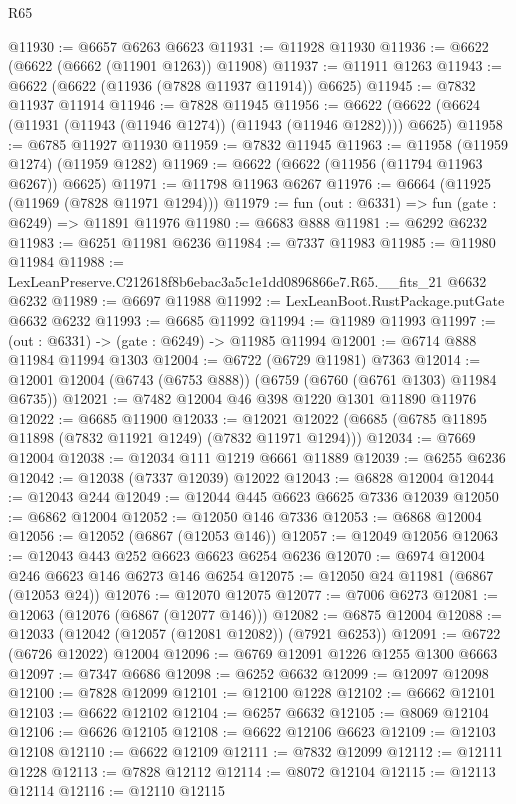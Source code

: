 \begin{lexlean}{R65}
\begin{coremodule}
{@11930 := @6657 @6263 @6623
@11931 := @11928 @11930
@11936 := @6622 (@6622 (@6662 (@11901 @1263)) @11908)
@11937 := @11911 @1263
@11943 := @6622 (@6622 (@11936 (@7828 @11937 @11914)) @6625)
@11945 := @7832 @11937 @11914
@11946 := @7828 @11945
@11956 := @6622 (@6622 (@6624 (@11931 (@11943 (@11946 @1274)) (@11943 (@11946 @1282)))) @6625)
@11958 := @6785 @11927 @11930
@11959 := @7832 @11945
@11963 := @11958 (@11959 @1274) (@11959 @1282)
@11969 := @6622 (@6622 (@11956 (@11794 @11963 @6267)) @6625)
@11971 := @11798 @11963 @6267
@11976 := @6664 (@11925 (@11969 (@7828 @11971 @1294)))
@11979 := fun (out : @6331) => fun (gate : @6249) => @11891 @11976
@11980 := @6683 @888
@11981 := @6292 @6232
@11983 := @6251 @11981 @6236
@11984 := @7337 @11983
@11985 := @11980 @11984
@11988 := LexLeanPreserve.C212618f8b6ebac3a5c1e1dd0896866e7.R65.__fits_21 @6632 @6232
@11989 := @6697 @11988
@11992 := LexLeanBoot.RustPackage.putGate @6632 @6232
@11993 := @6685 @11992
@11994 := @11989 @11993
@11997 := (out : @6331) -> (gate : @6249) -> @11985 @11994
@12001 := @6714 @888 @11984 @11994 @1303
@12004 := @6722 (@6729 @11981) @7363
@12014 := @12001 @12004 (@6743 (@6753 @888)) (@6759 (@6760 (@6761 @1303) @11984 @6735))
@12021 := @7482 @12004 @46 @398 @1220 @1301 @11890 @11976
@12022 := @6685 @11900
@12033 := @12021 @12022 (@6685 (@6785 @11895 @11898 (@7832 @11921 @1249) (@7832 @11971 @1294)))
@12034 := @7669 @12004
@12038 := @12034 @111 @1219 @6661 @11889
@12039 := @6255 @6236
@12042 := @12038 (@7337 @12039) @12022
@12043 := @6828 @12004
@12044 := @12043 @244
@12049 := @12044 @445 @6623 @6625 @7336 @12039
@12050 := @6862 @12004
@12052 := @12050 @146 @7336
@12053 := @6868 @12004
@12056 := @12052 (@6867 (@12053 @146))
@12057 := @12049 @12056
@12063 := @12043 @443 @252 @6623 @6623 @6254 @6236
@12070 := @6974 @12004 @246 @6623 @146 @6273 @146 @6254
@12075 := @12050 @24 @11981 (@6867 (@12053 @24))
@12076 := @12070 @12075
@12077 := @7006 @6273
@12081 := @12063 (@12076 (@6867 (@12077 @146)))
@12082 := @6875 @12004
@12088 := @12033 (@12042 (@12057 (@12081 @12082)) (@7921 @6253))
@12091 := @6722 (@6726 @12022) @12004
@12096 := @6769 @12091 @1226 @1255 @1300 @6663
@12097 := @7347 @6686
@12098 := @6252 @6632
@12099 := @12097 @12098
@12100 := @7828 @12099
@12101 := @12100 @1228
@12102 := @6662 @12101
@12103 := @6622 @12102
@12104 := @6257 @6632
@12105 := @8069 @12104
@12106 := @6626 @12105
@12108 := @6622 @12106 @6623
@12109 := @12103 @12108
@12110 := @6622 @12109
@12111 := @7832 @12099
@12112 := @12111 @1228
@12113 := @7828 @12112
@12114 := @8072 @12104
@12115 := @12113 @12114
@12116 := @12110 @12115
}
\end{coremodule}
\end{lexlean}
